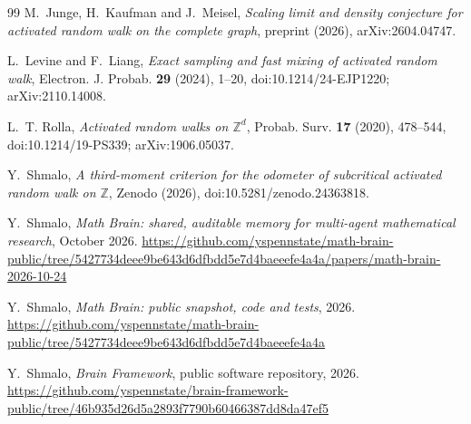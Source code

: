 \documentclass[11pt]{amsart}
\theoremstyle{remark}
\begin{document}
\begin{thebibliography}{99}
M.~Junge, H.~Kaufman and J.~Meisel,
\emph{Scaling limit and density conjecture for activated random walk on the complete graph},
preprint (2026), arXiv:2604.04747.

L.~Levine and F.~Liang,
\emph{Exact sampling and fast mixing of activated random walk},
Electron. J. Probab. \textbf{29} (2024), 1--20, doi:10.1214/24-EJP1220; arXiv:2110.14008.

L.~T. Rolla,
\emph{Activated random walks on $\mathbb Z^d$},
Probab. Surv. \textbf{17} (2020), 478--544, doi:10.1214/19-PS339; arXiv:1906.05037.

Y.~Shmalo,
\emph{A third-moment criterion for the odometer of subcritical activated random walk on $\mathbb Z$},
Zenodo (2026), doi:10.5281/zenodo.24363818.

Y.~Shmalo, \emph{Math Brain: shared, auditable memory for multi-agent mathematical research}, October 2026.
\url{https://github.com/yspennstate/math-brain-public/tree/5427734deee9be643d6dfbdd5e7d4baeeefe4a4a/papers/math-brain-2026-10-24}

Y.~Shmalo, \emph{Math Brain: public snapshot, code and tests}, 2026.
\url{https://github.com/yspennstate/math-brain-public/tree/5427734deee9be643d6dfbdd5e7d4baeeefe4a4a}

Y.~Shmalo, \emph{Brain Framework}, public software repository, 2026.
\url{https://github.com/yspennstate/brain-framework-public/tree/46b935d26d5a2893f7790b60466387dd8da47ef5}

\end{thebibliography}
\end{document}
